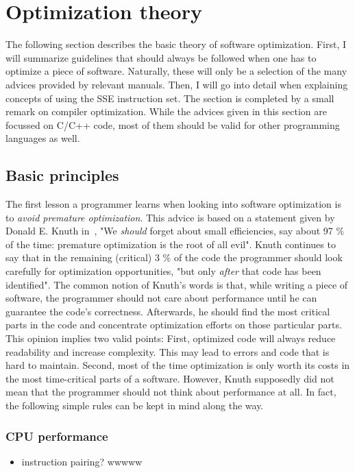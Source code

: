 \section{Optimization theory}
\label{Optimization_theory}
The following section describes the basic theory of software optimization. First, I will summarize guidelines that should always be followed when one has to optimize a piece of software. Naturally, these will only be a selection of the many advices provided by relevant manuals. Then, I will go into detail when explaining concepts of using the SSE instruction set. The section is completed by a small remark on compiler optimization. While the advices given in this section are focussed on C/C++ code, most of them should be valid for other programming languages as well.
\subsection{Basic principles}
The first lesson a programmer learns when looking into software optimization is to \emph{avoid premature optimization}. This advice is based on a statement given by Donald E. Knuth in~\cite{knuth1974}, "We \emph{should} forget about small efficiencies, say about 97 \% of the time: premature optimization is the root of all evil". Knuth continues to say that in the remaining (critical) 3 \% of the code the programmer should look carefully for optimization opportunities, "but only \emph{after} that code has been identified". The common notion of Knuth's words is that, while writing a piece of software, the programmer should not care about performance until he can guarantee the code's correctness. Afterwards, he should find the most critical parts in the code and concentrate optimization efforts on those particular parts. This opinion implies two valid points: First, optimized code will always reduce readability and increase complexity. This may lead to errors and code that is hard to maintain. Second, most of the time optimization is only worth its costs in the most time-critical parts of a software. However, Knuth supposedly did not mean that the programmer should not think about performance at all. In fact, the following simple rules can be kept in mind along the way.
\subsubsection{CPU performance}
\begin{itemize}
\item instruction pairing?
wwwww \end{itemize}
